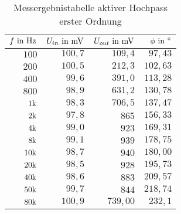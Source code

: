 \begin{table}[H]
\centering
\caption{Messergebnistabelle aktiver Hochpass erster Ordnung}
\label{tab:HP_erg_tab}
\begin{tabular}{|r|r|r|r|}
\hline
\rowcolor[HTML]{C0C0C0} 
$f\text{ in }\text{Hz}$       & $U_{in}\text{ in }\text{mV}$    & $U_{out}\text{ in }\text{mV}$   & $\phi\text{ in }^\circ$        \\ \hline
$100  $&$ 100,7 $&$ 109,4  $&$ 97,43  $\\ \hline
$200  $&$ 100,5 $&$ 212,3  $&$ 102,63 $\\ \hline
$400  $&$ 99,6  $&$ 391,0  $&$ 113,28 $\\ \hline
$800  $&$ 98,9  $&$ 631,2  $&$ 130,78 $\\ \hline
$1\text{k}  $&$ 98,3  $&$ 706,5  $&$ 137,47 $\\ \hline
$2\text{k}  $&$ 97,8  $&$ 865    $&$ 156,33 $\\ \hline
$4\text{k}  $&$ 99,0  $&$ 923    $&$ 169,31 $\\ \hline
$8\text{k}  $&$ 99,1  $&$ 939    $&$ 178,75 $\\ \hline
$10\text{k} $&$ 98,7  $&$ 940    $&$ 180,00 $\\ \hline
$20\text{k} $&$ 98,5  $&$ 928    $&$ 195,73 $\\ \hline
$40\text{k} $&$ 98,6  $&$ 883    $&$ 209,57 $\\ \hline
$50\text{k} $&$ 99,7  $&$ 844    $&$ 218,74 $\\ \hline
$80\text{k} $&$ 100,9 $&$ 739,00 $&$ 232,1 $\\ \hline
\end{tabular}
\end{table}